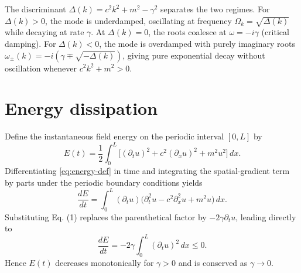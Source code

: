 \documentclass{article}
\begin{document}
The discriminant $\Delta(k) = c^2 k^2 + m^2 - \gamma^2$ separates the two regimes.
For $\Delta(k) > 0$, the mode is underdamped, oscillating at frequency
$\Omega_k = \sqrt{\Delta(k)}$ while decaying at rate $\gamma$. At $\Delta(k) = 0$,
the roots coalesce at $\omega = -i\gamma$ (critical damping). For $\Delta(k) < 0$,
the mode is overdamped with purely imaginary roots
$\omega_{\pm}(k) = -i(\gamma \mp \sqrt{-\Delta(k)})$, giving pure exponential decay
without oscillation whenever $c^2 k^2 + m^2 > 0$.

\section{Energy dissipation}\label{sec:energy}

Define the instantaneous field energy on the periodic interval $[0,L]$ by
\begin{equation}\label{eq:energy-def}
  E(t) = \frac{1}{2}\int_0^L \bigl[(\partial_t u)^2 + c^2 (\partial_x u)^2 + m^2 u^2\bigr]\,dx.
\end{equation}
Differentiating \eqref{eq:energy-def} in time and integrating the spatial-gradient
term by parts under the periodic boundary conditions yields
\[
  \frac{dE}{dt} = \int_0^L (\partial_t u)\bigl(\partial_t^2 u - c^2 \partial_x^2 u + m^2 u\bigr)\,dx.
\]
Substituting Eq. (1) replaces the parenthetical factor by $-2\gamma \partial_t u$,
leading directly to
\begin{equation}\label{eq:energy-rate}
  \frac{dE}{dt} = -2\gamma \int_0^L (\partial_t u)^2\,dx \leq 0.
\end{equation}
Hence $E(t)$ decreases monotonically for $\gamma > 0$ and is conserved as $\gamma \to 0$.
\end{document}
